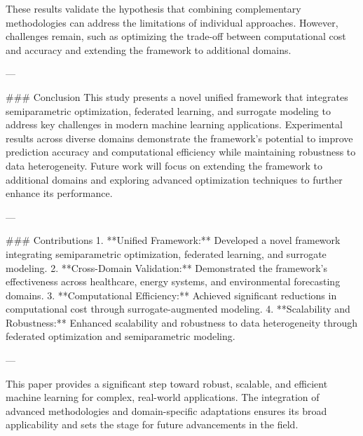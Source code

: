 These results validate the hypothesis that combining complementary methodologies can address the limitations of individual approaches. However, challenges remain, such as optimizing the trade-off between computational cost and accuracy and extending the framework to additional domains.

---

### Conclusion
This study presents a novel unified framework that integrates semiparametric optimization, federated learning, and surrogate modeling to address key challenges in modern machine learning applications. Experimental results across diverse domains demonstrate the framework's potential to improve prediction accuracy and computational efficiency while maintaining robustness to data heterogeneity. Future work will focus on extending the framework to additional domains and exploring advanced optimization techniques to further enhance its performance.

---

### Contributions
1. **Unified Framework:** Developed a novel framework integrating semiparametric optimization, federated learning, and surrogate modeling.
2. **Cross-Domain Validation:** Demonstrated the framework's effectiveness across healthcare, energy systems, and environmental forecasting domains.
3. **Computational Efficiency:** Achieved significant reductions in computational cost through surrogate-augmented modeling.
4. **Scalability and Robustness:** Enhanced scalability and robustness to data heterogeneity through federated optimization and semiparametric modeling.

--- 

This paper provides a significant step toward robust, scalable, and efficient machine learning for complex, real-world applications. The integration of advanced methodologies and domain-specific adaptations ensures its broad applicability and sets the stage for future advancements in the field.